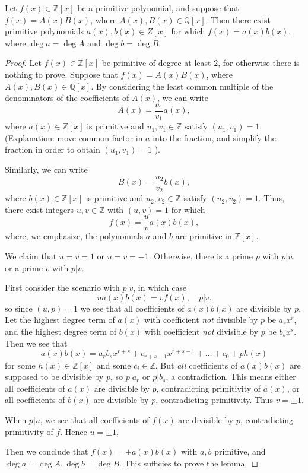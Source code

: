 \begin{theorem}
	Let $f(x) \in \mathbb{Z}[x]$ be a primitive polynomial, and suppose that $f(x) = A(x)B(x)$, where $A(x), B(x) \in \mathbb{Q}[x]$. Then there exist primitive polynomials $a(x), b(x) \in Z[x]$ for which $f(x) = a(x) b(x)$, where $\operatorname{deg} a = \operatorname{deg} A$ and $\operatorname{deg}  b = \operatorname{deg} B$.
\end{theorem}
\begin{proof}
	Let $f(x) \in \mathbb{Z}[x]$ be primitive of degree at least $2$, for otherwise there is nothing to prove. Suppose that $f(x) = A(x)B(x)$, where $A(x), B(x) \in \mathbb{Q}[x]$. By considering the least common multiple of the denominators of the coefficients of $A(x)$, we can write 
	\[
		A(x) = \frac{u_1}{v_1}a(x)
	,\]
	where $a(x) \in \mathbb{Z}[x]$ is primitive and $u_1, v_1 \in \mathbb{Z}$ satisfy $(u_1, v_1) = 1$. (Explanation: move common factor in  $a$ into the fraction, and simplify the fraction in order to obtain $(u_1, v_1) = 1$ ).

	Similarly, we can write
	 \[
		B(x) = \frac{u_2}{v_2}b(x)
	,\] 
	where $b(x) \in \mathbb{Z}[x]$ is primitive and $u_2, v_2 \in \mathbb{Z}$ satisfy $(u_2, v_2) = 1$. 
	Thus, there exist integers $u, v \in \mathbb{Z}$ with $(u,v) = 1$ for which 
	\[
		f(x) = \frac{u}{v} a(x) b(x)
	,\] 
	where, we emphasize, the polynomials $a$ and $b$ are primitive in $\mathbb{Z}[x]$.
	
	We claim that $u = v = 1$ or $u = v = -1$. Otherwise, there is a prime $p$ with $p | u$, or a prime $v$ with $p | v$.

	First consider the scenario with $p | v$, in which case
	\[
		u a(x) b(x) = vf(x), \quad p | v
	.\] 
	so since $(u, p) = 1$ we see that all coefficients of $a(x)b(x) $ are divisible by $p$. Let the highest degree term of $a(x)$ with coefficient \textit{not} divisible by $p$ be $a_r x^r$, and the highest degree term of $b(x)$ with coefficient \textit{not} divisible by $p$ be $b_s x^s$. Then we see that
	\[
		a(x)b(x) = a_rb_sx^{r+s} + c_{r+s-1} x^{r+s-1} + \ldots + c_0 + p h(x)
	\]
	for some $h(x) \in \mathbb{Z}[x]$ and some $c_i \in \mathbb{Z}$. But \textit{all} coefficients of $a(x) b(x)$ are supposed to be divisible by $p$, so $p | a_r$ or $p | b_s$, a contradiction. This means either all coefficients of $a(x)$ are divisible by $p$, contradicting primitivity of $a(x)$, or all coefficients of $b(x) $ are divisible by $p$, contradicting primitivity. Thus $v = \pm 1$.

	When $p | u$, we see that all coefficients of $f(x)$ are divisible by $p$, contradicting primitivity of $f$. Hence $u = \pm 1$,

	Then we conclude that $f(x) = \pm  a(x) b(x)$ with $a, b$ primitive, and $\operatorname{deg} a  = \operatorname{deg} A, \operatorname{deg} b = \operatorname{deg} B$. This sufficies to prove the lemma.
\end{proof}


